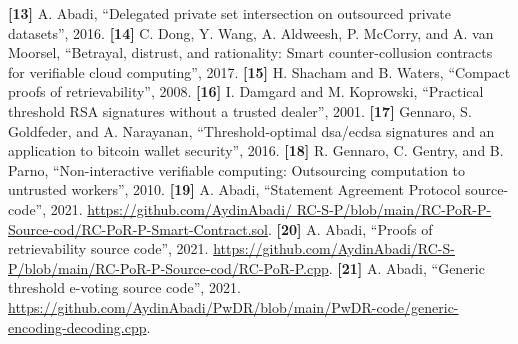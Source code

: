 %
%
\textbf{[13]} A. Abadi, ``Delegated private set intersection on outsourced private datasets'', 2016.
%
%
\textbf{[14]}   C. Dong, Y. Wang, A. Aldweesh, P. McCorry, and A. van Moorsel, ``Betrayal, distrust, and rationality:
Smart counter-collusion contracts for verifiable cloud computing'', 2017.
%
%
\textbf{[15]}  H. Shacham and B. Waters, ``Compact proofs of retrievability'', 2008.
%
%
\textbf{[16]}  I. Damgard and M. Koprowski, ``Practical threshold {RSA} signatures without a trusted dealer'', 2001.
%
%
\textbf{[17]} Gennaro, S. Goldfeder, and A. Narayanan, ``Threshold-optimal dsa/ecdsa signatures and an application to bitcoin wallet security'', 2016.
%
%
\textbf{[18]} R. Gennaro, C. Gentry, and B. Parno, ``Non-interactive verifiable computing: Outsourcing computation to untrusted workers'', 2010.
%
%
\textbf{[19]} A. Abadi, ``{S}tatement {A}greement {P}rotocol source-code'', 2021. \url{https://github.com/AydinAbadi/
RC-S-P/blob/main/RC-PoR-P-Source-cod/RC-PoR-P-Smart-Contract.sol}.
%
%
\textbf{[20]} A. Abadi, ``Proofs of retrievability source code'', 2021. \url{https://github.com/AydinAbadi/RC-S-P/blob/main/RC-PoR-P-Source-cod/RC-PoR-P.cpp}.
%
\textbf{[21]} A. Abadi, ``Generic threshold e-voting source code'', 2021. \url{https://github.com/AydinAbadi/PwDR/blob/main/PwDR-code/generic-encoding-decoding.cpp}.
%
